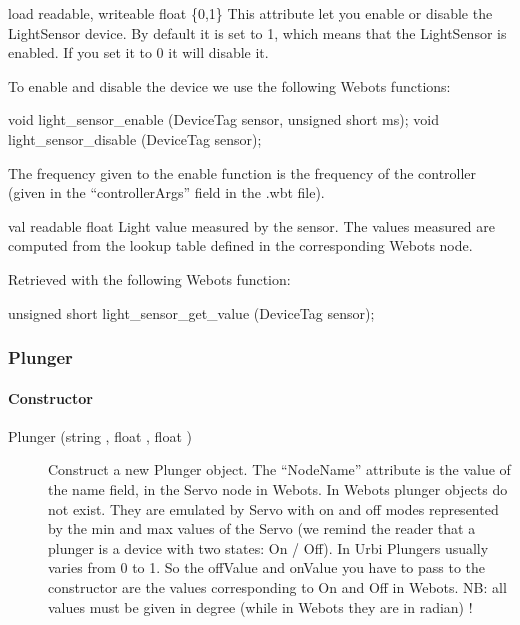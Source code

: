 \noindent
\begin{itemize}
\begin{attribute}{load}
  {readable, writeable}
  {float}
  {\{0,1\}}
  This attribute let you enable or disable the
  LightSensor device.  By default it is set to 1, which means that the
  LightSensor is enabled. If you set it to 0 it will disable it.

  To enable and disable the device we use the following Webots functions:

\begin{cxx}
void light_sensor_enable (DeviceTag sensor, unsigned short ms);
void light_sensor_disable (DeviceTag sensor);
\end{cxx}

The frequency given to the enable function is the frequency of the
\urbi controller (given in the ``controllerArgs'' field in the .wbt
file).
\end{attribute}

\begin{attribute}{val}
  {readable}
  {float}
  {}
  Light value measured by the sensor. The values measured
  are computed from the lookup table defined in the corresponding
  Webots node.

  Retrieved with the following Webots function:
\begin{cxx}
unsigned short light_sensor_get_value  (DeviceTag sensor);
\end{cxx}
\end{attribute}

\end{itemize}

\subsubsection{Plunger}

\paragraph{Constructor}

\noindent
\begin{description}
\item[{Plunger (string , float , float
    )}] Construct a new Plunger object. The ``NodeName''
  attribute is the value of the name field, in the Servo node in
  Webots. In Webots plunger objects do not exist. They are emulated by
  Servo with on and off modes represented by the min and max values of
  the Servo (we remind the reader that a plunger is a device with two
  states: On / Off). In Urbi Plungers usually varies from 0 to 1. So
  the offValue and onValue you have to pass to the constructor are the
  values corresponding to On and Off in Webots. NB: all values must be
  given in degree (while in Webots they are in radian) !
\end{description}

